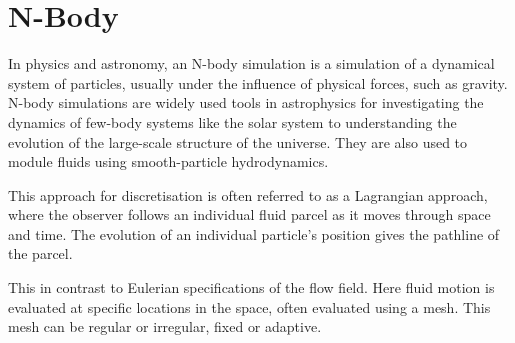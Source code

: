 
\section{N-Body}
\label{sec:nbody}
In physics and astronomy, an N-body simulation is a simulation of a dynamical system of particles, usually under the influence of physical forces, such as gravity. N-body simulations are widely used tools in astrophysics for investigating the dynamics of few-body systems like the solar system to understanding the evolution of the large-scale structure of the universe. They are also used to module fluids using smooth-particle hydrodynamics. 

\par 
This approach for discretisation is often referred to as a Lagrangian approach, where the observer follows an individual fluid parcel as it moves through space and time. The evolution of an individual particle's position gives the pathline of the parcel. 

\par 
This in contrast to Eulerian specifications of the flow field. Here fluid motion is evaluated at specific locations in the space, often evaluated using a mesh. This mesh can be regular or irregular, fixed or adaptive. 

